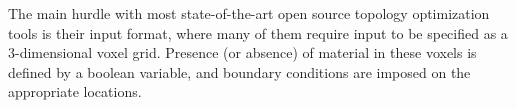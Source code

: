 

The main hurdle with most state-of-the-art open source topology optimization tools is their input format, where many of them require input to be specified as a 3-dimensional voxel grid. Presence (or absence) of material in these voxels is defined by a boolean variable, and boundary conditions are imposed on the appropriate locations. %

